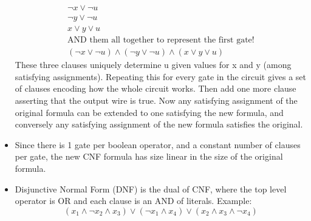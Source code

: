 \documentclass{article}
\begin{document}
\begin{itemize}
\begin{align*}
\neg x \lor \neg u \\
\neg y \lor \neg u \\
x \lor y \lor u\\
\text{AND them all together to represent the first gate!} \\
(\neg x \lor \neg u) \land (\neg y \lor \neg u) \land (x \lor y \lor u)
\end{align*}
These three clauses uniquely determine u given values for x and y (among satisfying assignments). Repeating this for every gate in the circuit gives a set of clauses encoding how the whole circuit works. Then add one more clause asserting that the output wire is true. Now any satisfying assignment of the original formula can be extended to one satisfying the new formula, and conversely any satisfying assignment of the new formula satisfies the original.
\item Since there is 1 gate per boolean operator, and a constant number of clauses per gate, the new CNF formula has size linear in the size of the original formula.
\item Disjunctive Normal Form (DNF) is the dual of CNF, where the top level operator is OR and each clause is an AND of literals. Example: \[(x_1 \land \neg x_2 \land x_3) \lor (\neg x_1 \land x_4) \lor (x_2 \land x_3 \land \neg x_4)\]
\end{itemize}
\end{document}
